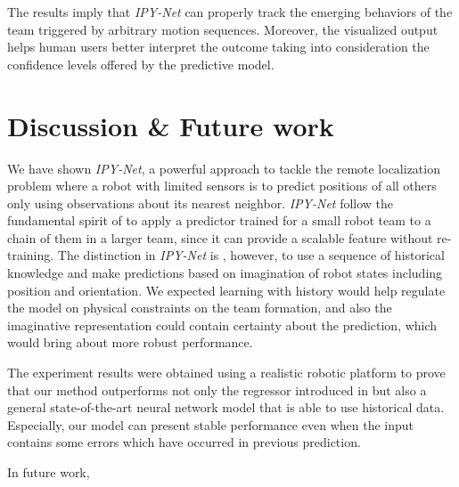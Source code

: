 \documentclass[letterpaper, 10 pt, conference]{ieeeconf}  %
\begin{document}
	The results imply that \emph{IPY-Net} can properly track the emerging behaviors of the team 
	triggered by arbitrary motion sequences. Moreover, the visualized output helps
	human users better interpret the outcome taking into consideration the confidence levels 
	offered by the predictive model. 
	

	\section{Discussion \& Future work}
	\label{sec:discussion_and_future_work}
	
	We have shown \emph{IPY-Net}, a powerful approach to tackle the remote localization problem 
	where a robot with limited sensors is to predict positions of all others only using 
	observations about its nearest neighbor. 
	\emph{IPY-Net} follow the fundamental spirit of \cite{CPR17} to apply a predictor 
	trained for a small robot team to a chain of them in a larger team, since it 
	can provide a scalable feature without re-training.   
	The distinction in \emph{IPY-Net} is , however, to use a sequence of historical knowledge and 
	make predictions based on imagination of robot states including position and orientation.
	We expected learning with history would help regulate the model on physical constraints on 
	the team formation, and also the imaginative representation could contain 
	certainty about the prediction, which would bring about more robust performance. 
	
	The experiment results were obtained using a realistic robotic platform to prove 
	that our method outperforms not only the regressor
	introduced in \cite{CPR17} but also a general state-of-the-art neural network 
	model that is able to use historical data. Especially, our model can present 
	stable performance even when the input contains some errors which have occurred in 
	previous prediction. 
	  
	
	In future work, 
	
	
{\small
	
	
}
\end{document}
